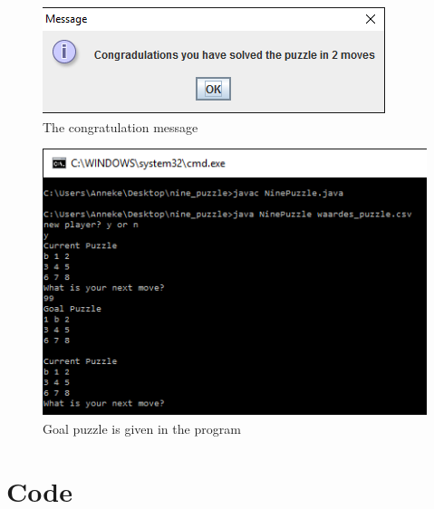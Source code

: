 \documentclass[10pt]{article}
\begin{document}
\begin{figure}
\centering
\includegraphics[scale=0.8]{./Prente/prent6.png}
\caption{The congratulation message}
\label{prent6}
\end{figure}

\begin{figure}
\centering
\includegraphics[scale=0.8]{./Prente/prent7.png}
\caption{Goal puzzle is given in the program}
\label{prent7}
\end{figure}

\section{Code}
 \begin{scriptsize}
 
 \end{scriptsize}

 
\end{document}
